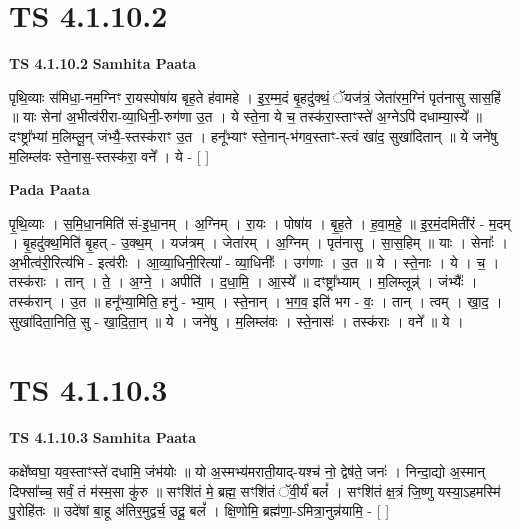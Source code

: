 \documentclass[17pt]{extarticle}
\begin{document}
\section*{ TS 4.1.10.2 }

\textbf{TS 4.1.10.2 } \newline
\textbf{Samhita Paata} \newline

पृथि॒व्याः स॑मिधा॒-नम॒ग्निꣳ रा॒यस्पोषा॑य बृह॒ते ह॑वामहे । इ॒र॒म्म॒दं बृ॒हदु॑क्थं॒ ॅयज॑त्रं॒ जेता॑रम॒ग्निं पृत॑नासु सास॒हिं ॥ याः सेना॑ अ॒भीत्व॑रीरा-व्या॒धिनी॒-रुग॑णा उ॒त । ये स्ते॒ना ये च॒ तस्क॑रा॒स्ताꣳस्ते॑ अ॒ग्नेऽपि॑ दधाम्या॒स्ये᳚ ॥ दꣳष्ट्रा᳚भ्यां म॒लिम्लू॒न् जंभ्यै॒-स्तस्क॑राꣳ उ॒त । हनू᳚भ्याꣳ स्ते॒नान्-भ॑गव॒स्ताꣳ-स्त्वं खा॑द॒ सुखा॑दितान् ॥ ये जने॑षु म॒लिम्ल॑वः स्ते॒नास॒-स्तस्क॑रा॒ वने᳚ । ये - [  ] \newline

\textbf{Pada Paata} \newline

पृ॒थि॒व्याः । स॒मि॒धा॒नमिति॑ सं-इ॒धा॒नम् । अ॒ग्निम् । रा॒यः । पोषा॑य । बृ॒ह॒ते । ह॒वा॒म॒हे॒ ॥ इ॒र॒मं॒दमिती॑रं - म॒दम् । बृ॒हदु॑क्थ॒मिति॑ बृ॒हत् - उ॒क्थ॒म् । यज॑त्रम् । जेता॑रम् । अ॒ग्निम् । पृत॑नासु । सा॒स॒हिम् ॥ याः । सेनाः᳚ । अ॒भीत्व॑री॒रित्य॑भि - इत्व॑रीः । आ॒व्या॒धिनी॒रित्या᳚ - व्या॒धिनीः᳚ । उग॑णाः । उ॒त ॥ ये । स्ते॒नाः । ये । च॒ । तस्क॑राः । तान् । ते॒ । अ॒ग्ने॒ । अपीति॑ । द॒धा॒मि॒ । आ॒स्ये᳚ ॥ दꣳष्ट्रा᳚भ्याम् । म॒लिम्लून्न्॑ । जंभ्यैः᳚ । तस्क॑रान् । उ॒त ॥ हनू᳚भ्या॒मिति॒ हनु॑ - भ्या॒म् । स्ते॒नान् । भ॒ग॒व॒ इति॑ भग - वः॒ । तान् । त्वम् । खा॒द॒ । सुखा॑दिता॒निति॒ सु - खा॒दि॒ता॒न् ॥ ये । जने॑षु । म॒लिम्ल॑वः । स्ते॒नासः॑ । तस्क॑राः । वने᳚ ॥ ये ।  \newline




\section*{ TS 4.1.10.3 }

\textbf{TS 4.1.10.3 } \newline
\textbf{Samhita Paata} \newline

कक्षे᳚ष्वघा॒ यव॒स्ताꣳस्ते॑ दधामि॒ जंभ॑योः ॥ यो अ॒स्मभ्य॑मराती॒याद्-यश्च॑ नो॒ द्वेष॑ते॒ जनः॑ । निन्दा॒द्यो अ॒स्मान् दिफ्सा᳚च्च॒ सर्वं॒ तं म॑स्म॒सा कु॑रु ॥ सꣳशि॑तं मे॒ ब्रह्म॒ सꣳशि॑तं ॅवी॒र्यं॑ बलं᳚ । सꣳशि॑तं क्ष॒त्रं जि॒ष्णु यस्या॒ऽहमस्मि॑ पु॒रोहि॑तः ॥ उदे॑षां बा॒हू अ॑तिर॒मुद्वर्च॒ उदू॒ बलं᳚ । क्षि॒णोमि॒ ब्रह्म॑णा॒-ऽमित्रा॒नुन्न॑यामि॒ - [  ] \newline
\end{document}
